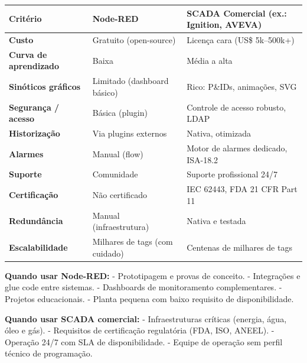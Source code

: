 \begin{longtable}[]{@{}
  >{\raggedright\arraybackslash}p{}
  >{\raggedright\arraybackslash}p{}
  >{\raggedright\arraybackslash}p{}@{}}
\toprule\noalign{}
\begin{minipage}[b]{\linewidth}\raggedright
Critério
\end{minipage} & \begin{minipage}[b]{\linewidth}\raggedright
Node-RED
\end{minipage} & \begin{minipage}[b]{\linewidth}\raggedright
SCADA Comercial (ex.: Ignition, AVEVA)
\end{minipage} \\
\midrule\noalign{}
\endhead
\bottomrule\noalign{}
\endlastfoot
\textbf{Custo} & Gratuito (open-source) & Licença cara (US\$ 5k--500k+) \\
\textbf{Curva de aprendizado} & Baixa & Média a alta \\
\textbf{Sinóticos gráficos} & Limitado (dashboard básico) & Rico: P\&IDs, animações, SVG \\
\textbf{Segurança / acesso} & Básica (plugin) & Controle de acesso robusto, LDAP \\
\textbf{Historização} & Via plugins externos & Nativa, otimizada \\
\textbf{Alarmes} & Manual (flow) & Motor de alarmes dedicado, ISA-18.2 \\
\textbf{Suporte} & Comunidade & Suporte profissional 24/7 \\
\textbf{Certificação} & Não certificado & IEC 62443, FDA 21 CFR Part 11 \\
\textbf{Redundância} & Manual (infraestrutura) & Nativa e testada \\
\textbf{Escalabilidade} & Milhares de tags (com cuidado) & Centenas de milhares de tags \\
\end{longtable}

\textbf{Quando usar Node-RED:}
- Prototipagem e provas de conceito.
- Integrações e glue code entre sistemas.
- Dashboards de monitoramento complementares.
- Projetos educacionais.
- Planta pequena com baixo requisito de disponibilidade.

\textbf{Quando usar SCADA comercial:}
- Infraestruturas críticas (energia, água, óleo e gás).
- Requisitos de certificação regulatória (FDA, ISO, ANEEL).
- Operação 24/7 com SLA de disponibilidade.
- Equipe de operação sem perfil técnico de programação.

